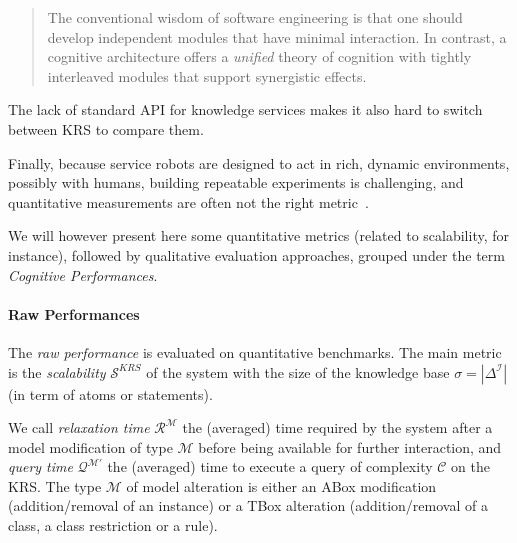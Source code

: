\documentclass[a4paper, twocolumn]{article}
\begin{document}
\begin{quote}
The conventional wisdom of software engineering is that one should
develop independent modules that have minimal interaction. In contrast, a
cognitive architecture offers a \emph{unified} theory of cognition with tightly
interleaved modules that support synergistic effects.
\end{quote}

The lack of standard API for knowledge services makes it also hard to switch
between KRS to compare them.

Finally, because service robots are designed to act in rich, dynamic
environments, possibly with humans, building repeatable experiments is
challenging, and quantitative measurements are often not the right
metric~\cite{Langley2006}.

We will however present here some quantitative metrics (related to scalability,
for instance), followed by qualitative evaluation approaches, grouped under the
term \emph{Cognitive Performances}.

\begin{scriptsize}
\begin{center}
\end{center}
\end{scriptsize}


\paragraph{Raw Performances} The \emph{raw performance} is evaluated on
quantitative benchmarks. The main metric is the \emph{scalability}
$\mathcal{S}^{KRS}$ of the system with the size of the knowledge base
$\sigma=|\Delta^{\mathcal{I}}|$  (in term of atoms or statements).

We call \emph{relaxation time} $\mathcal{R}^{\mathcal{M}}$ the (averaged) time
required by the system after a model modification of type $\mathcal{M}$ before
being available for further interaction, and \emph{query time}
$\mathcal{Q}^{\mathcal{M}'}$ the (averaged) time to execute a query of
complexity $\mathcal{C}$ on the KRS. The type $\mathcal{M}$ of model
alteration is either an ABox modification (addition/removal of an instance) or
a TBox alteration (addition/removal of a class, a class restriction or a rule).
\end{document}
